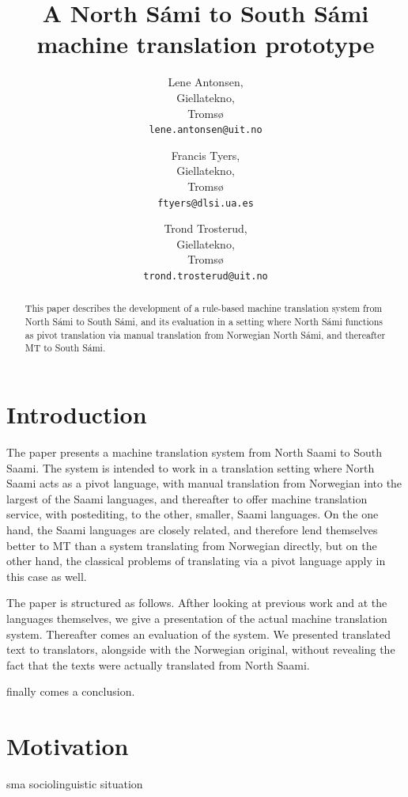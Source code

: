 \documentclass[a4paper,11pt,twocolumn]{article}
\title{A North Sámi to South Sámi machine translation prototype}
\author{Lene Antonsen,\\Giellatekno,\\Tromsø\\{\tt lene.antonsen@uit.no}
\and Francis Tyers,\\Giellatekno,\\Tromsø\\{\tt ftyers@dlsi.ua.es}
\and Trond Trosterud,\\Giellatekno,\\Tromsø\\{\tt trond.trosterud@uit.no}}
\date{}
\begin{document}
\maketitle


\begin{abstract}
This paper describes the development of a rule-based
machine translation system from North Sámi to South
Sámi, and its evaluation in a setting where North Sámi
functions as pivot translation via manual translation
from Norwegian North Sámi, and thereafter MT to South Sámi. 
\end{abstract}

\section{Introduction}

The paper presents a machine translation system from North Saami to
South Saami. The system is intended to work in a translation setting
where North Saami acts as a pivot language, with manual translation
from Norwegian into the largest of the Saami languages, and thereafter
to offer machine translation service, with postediting, to the other,
smaller, Saami languages. On the one hand, the Saami languages are
closely related, and therefore lend themselves better to MT than a
system translating from Norwegian directly, but on the other hand, the
classical problems of translating via a pivot language apply in this
case as well. 

The paper is structured as follows. Afther looking at previous work
and at the languages themselves, we give a presentation of the actual
machine translation system. Thereafter comes an evaluation of the
system. We presented translated text to translators, alongside with
the Norwegian original, without revealing the fact that the texts were
actually translated from North Saami.

finally comes a conclusion.


\cite{tyers09} \cite{wiechetek10} \cite{trosterud12}
\cite{AntonsenEtalReusing2010}

\cite{babych2007}

\section{Motivation}
sma sociolinguistic situation \cite{Todalsvahken2007}
\end{document}
